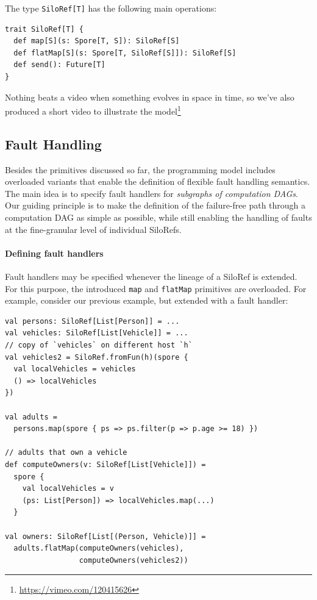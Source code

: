 \documentclass[preprint]{sigplanconf}
\theoremstyle{definition}
\theoremstyle{definition}
\begin{document}
The type \verb|SiloRef[T]| has the following main operations:

\begin{lstlisting}
trait SiloRef[T] {
  def map[S](s: Spore[T, S]): SiloRef[S]
  def flatMap[S](s: Spore[T, SiloRef[S]]): SiloRef[S]
  def send(): Future[T]
}
\end{lstlisting}


Nothing beats a video when something evolves in space in time, so we've also produced a short video to illustrate the model\footnote{\url{https://vimeo.com/120415626}}


\subsection{Fault Handling}
\label{sec:fault-handling}

Besides the primitives discussed so far, the programming model includes
overloaded variants that enable the definition of flexible fault handling
semantics. The main idea is to specify fault handlers for \emph{subgraphs of
computation DAGs}. Our guiding principle is to make the definition of the
failure-free path through a computation DAG as simple as possible, while still
enabling the handling of faults at the fine-granular level of individual
SiloRefs.

\paragraph{Defining fault handlers} Fault handlers may be specified whenever
the lineage of a SiloRef is extended. For this purpose, the introduced
\verb|map| and \verb|flatMap| primitives are overloaded. For example,
consider our previous example, but extended with a fault handler:

\begin{lstlisting}
val persons: SiloRef[List[Person]] = ...
val vehicles: SiloRef[List[Vehicle]] = ...
// copy of `vehicles` on different host `h`
val vehicles2 = SiloRef.fromFun(h)(spore {
  val localVehicles = vehicles
  () => localVehicles
})

val adults =
  persons.map(spore { ps => ps.filter(p => p.age >= 18) })

// adults that own a vehicle
def computeOwners(v: SiloRef[List[Vehicle]]) =
  spore {
    val localVehicles = v
    (ps: List[Person]) => localVehicles.map(...)
  }

val owners: SiloRef[List[(Person, Vehicle)]] =
  adults.flatMap(computeOwners(vehicles),
                 computeOwners(vehicles2))
\end{lstlisting}
\end{document}
